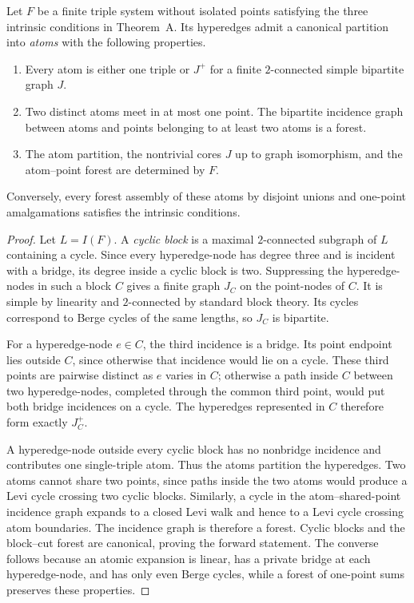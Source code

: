 \begin{theorem}
\label{theorem-canonical-atom-normal-form}
Let $F$ be a finite triple system without isolated points satisfying the three
intrinsic conditions in Theorem~A.  Its hyperedges admit a canonical partition
into \emph{atoms} with the following properties.
\begin{enumerate}
\item Every atom is either one triple or $J^+$ for a finite $2$-connected
simple bipartite graph $J$.
\item Two distinct atoms meet in at most one point.  The bipartite incidence
graph between atoms and points belonging to at least two atoms is a forest.
\item The atom partition, the nontrivial cores $J$ up to graph isomorphism, and
the atom--point forest are determined by $F$.
\end{enumerate}
Conversely, every forest assembly of these atoms by disjoint unions and
one-point amalgamations satisfies the intrinsic conditions.
\end{theorem}
\begin{proof}
Let $L=I(F)$.  A \emph{cyclic block} is a maximal $2$-connected subgraph of
$L$ containing a cycle.  Since every hyperedge-node has degree three and is
incident with a bridge, its degree inside a cyclic block is two.  Suppressing
the hyperedge-nodes in such a block $C$ gives a finite graph $J_C$ on the
point-nodes of $C$.  It is simple by linearity and $2$-connected by standard
block theory.  Its cycles correspond to Berge cycles of the same lengths, so
$J_C$ is bipartite.

For a hyperedge-node $e\in C$, the third incidence is a bridge.  Its point
endpoint lies outside $C$, since otherwise that incidence would lie on a
cycle.  These third points are pairwise distinct as $e$ varies in $C$;
otherwise a path inside $C$ between two hyperedge-nodes, completed through the
common third point, would put both bridge incidences on a cycle.  The
hyperedges represented in $C$ therefore form exactly $J_C^+$.

A hyperedge-node outside every cyclic block has no nonbridge incidence and
contributes one single-triple atom.  Thus the atoms partition the hyperedges.
Two atoms cannot share two points, since paths inside the two atoms would
produce a Levi cycle crossing two cyclic blocks.  Similarly, a cycle in the
atom--shared-point incidence graph expands to a closed Levi walk and hence to
a Levi cycle crossing atom boundaries.  The incidence graph is therefore a
forest.  Cyclic blocks and the block--cut forest are canonical, proving the
forward statement.  The converse follows because an atomic expansion is
linear, has a private bridge at each hyperedge-node, and has only even Berge
cycles, while a forest of one-point sums preserves these properties.
\end{proof}

